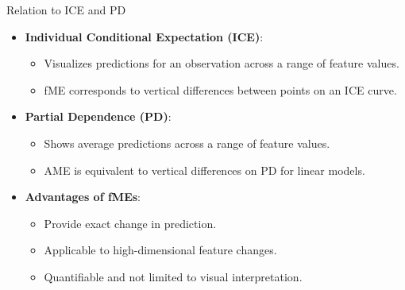 \documentclass[11pt,compress,t,notes=noshow, aspectratio=169, xcolor=table]{beamer}
\begin{document}




\begin{frame}{Relation to ICE and PD}
\begin{itemize}
\item \textbf{Individual Conditional Expectation (ICE)}:
\begin{itemize}
\item Visualizes predictions for an observation across a range of feature values.
\item fME corresponds to vertical differences between points on an ICE curve.
\end{itemize}
\item \textbf{Partial Dependence (PD)}:
\begin{itemize}
\item Shows average predictions across a range of feature values.
\item AME is equivalent to vertical differences on PD for linear models.
\end{itemize}
\item \textbf{Advantages of fMEs}:
\begin{itemize}
\item Provide exact change in prediction.
\item Applicable to high-dimensional feature changes.
\item Quantifiable and not limited to visual interpretation.
\end{itemize}
\end{itemize}
\end{frame}
\end{document}
